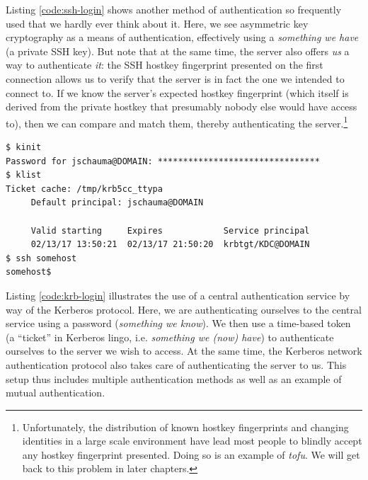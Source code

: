Listing \ref{code:ssh-login} shows another method of
authentication so frequently used that we hardly ever
think about it.  Here, we see asymmetric key
cryptography as a means
of authentication, effectively using a {\em something
we have} (a private SSH key).  But note that at the
same time, the server also offers {\em us} a way to
authenticate {\em it}: the SSH hostkey fingerprint
presented on the first connection allows us to verify
that the server is in fact the one we intended to
connect to.  If we know the server's expected hostkey
fingerprint (which itself is derived from the private
hostkey that presumably nobody else would have access
to), then we can compare and match them, thereby
authenticating the server.\footnote{Unfortunately, the
distribution of known hostkey fingerprints and
changing identities in a large scale environment have
lead most people to blindly accept any hostkey
fingerprint presented.  Doing so is an example of {\em
\gls{tofu}}.  We will get
back to this problem in later chapters.}

\begin{lstlisting}[float,basicstyle=\scriptsize,label=code:krb-login,caption={[Kerberos authentication]Mutual authentication via a central Kerberos service.}]
$ kinit
Password for jschauma@DOMAIN: ********************************
$ klist
Ticket cache: /tmp/krb5cc_ttypa
     Default principal: jschauma@DOMAIN

     Valid starting     Expires            Service principal
     02/13/17 13:50:21  02/13/17 21:50:20  krbtgt/KDC@DOMAIN
$ ssh somehost
somehost$
\end{lstlisting}

Listing \ref{code:krb-login} illustrates the use of a
central authentication service by way of the
Kerberos protocol.  Here, we are
authenticating ourselves to the central service using
a password ({\em something we know}).  We then use a
time-based token (a ``ticket'' in Kerberos lingo, i.e.
{\em something we (now) have}) to authenticate
ourselves to the server we wish to access.  At the
same time, the Kerberos network authentication
protocol also takes care of authenticating the server
to us.  This setup thus includes multiple
authentication methods as well as an example of mutual
authentication.

